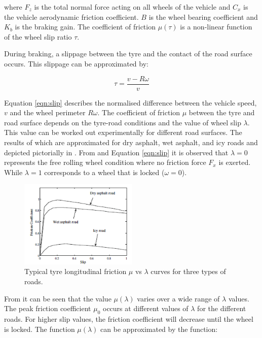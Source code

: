 \documentclass[10pt,twocolumn]{witseiepaper}
\begin{document}
where $F_z$ is the total normal force acting on all wheels of the vehicle and $C_x$ is the vehicle aerodynamic friction coefficient. $B$ is the wheel bearing coefficient and $K_b$ is the braking gain. The coefficient of friction $\mu (\tau)$ is a non-linear function of the wheel slip ratio $\tau$. 

During braking, a slippage between the tyre and the contact of the road surface occurs. This slippage can be approximated by: 

\begin{equation}
	\tau = \frac{v - R \omega}{v}
	\label{eqn:slip}
\end{equation}

Equation \ref{eqn:slip} describes the normalised difference between the vehicle speed, $v$ and the wheel perimeter $R\omega$. The coefficient of friction $\mu$ between the tyre and road surface depends on the tyre-road conditions and the value of wheel slip $\lambda$. This value can be worked out experimentally for different road surfaces. The results of which are approximated for dry asphalt, wet asphalt, and icy roads and depicted pictorially in . From  and Equation \ref{eqn:slip} it is observed that $\lambda = 0$ represents the free rolling wheel condition where no friction force $F_x$ is exerted. While $\lambda = 1$ corresponds to a wheel that is locked ($\omega = 0$). 

\begin{figure}[ht!]
	\centering
		\includegraphics[width=0.50\textwidth]{slip.png}
	\caption{Typical tyre longitudinal friction $\mu$ vs $\lambda$ curves for three types of roads. \cite{Tiem:2008}}
	\label{fig:slip}
\end{figure}

From  it can be seen that the value $\mu (\lambda)$ varies over a wide range of $\lambda$ values. The peak friction coefficient $\mu _0$ occurs at different values of $\lambda$ for the different roads. For higher slip values, the friction coefficient will decrease until the wheel is locked. The function $\mu (\lambda)$  can be approximated by the function:
\end{document}
